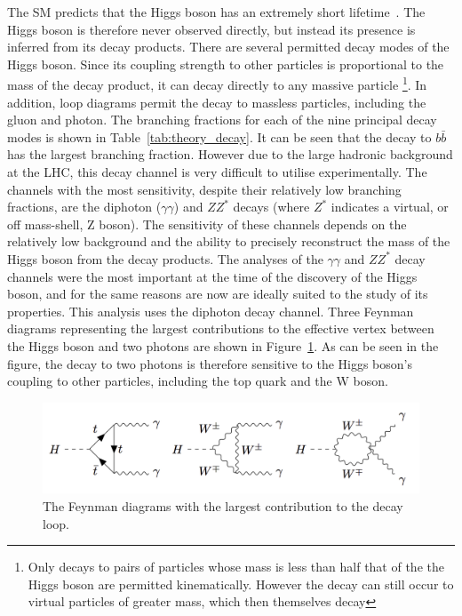 The SM predicts that the Higgs boson has an extremely short lifetime~\cite{YR4}.
The Higgs boson is therefore never observed directly, 
but instead its presence is inferred from its decay products.
There are several permitted decay modes of the Higgs boson.
Since its coupling strength to other particles is proportional to the mass of the decay product, 
it can decay directly to any massive particle
\footnote{Only decays to pairs of particles whose mass is less than half that of the the Higgs boson
are permitted kinematically. 
However the decay can still occur to virtual particles of greater mass, 
which then themselves decay}.
In addition, loop diagrams permit the decay to massless particles, including the gluon and photon.
The branching fractions for each of the nine principal decay modes 
is shown in Table~\ref{tab:theory_decay}.
It can be seen that the decay to $b\bar{b}$ has the largest branching fraction.
However due to the large hadronic background at the LHC, 
this decay channel is very difficult to utilise experimentally.
The channels with the most sensitivity, despite their relatively low branching fractions, 
are the diphoton ($\gamma\gamma$) and $ZZ^{*}$ decays 
(where $Z^{*}$ indicates a virtual, or off mass-shell, Z boson).
The sensitivity of these channels depends on the relatively low background 
and the ability to precisely reconstruct the mass of the Higgs boson from the decay products.
The analyses of the $\gamma\gamma$ and $ZZ^{*}$ decay channels were the most important 
at the time of the discovery of the Higgs boson, 
and for the same reasons are now are ideally suited to the study of its properties.
This analysis uses the diphoton decay channel.
Three Feynman diagrams representing the largest contributions to the effective vertex 
between the Higgs boson and two photons are shown in Figure~\ref{fig:theory_FeynDecay}.
As can be seen in the figure, 
the decay to two photons is therefore sensitive to the Higgs boson's coupling to other particles, 
including the top quark and the W boson.

\begin{figure}[hptb]
\centering
\includegraphics[width=\textwidth]{Figures/Theory/FeynDecay.png}
\caption{
  The Feynman diagrams with the largest contribution to the \Hgg decay loop.
}
\label{fig:theory_FeynDecay}
\end{figure}

